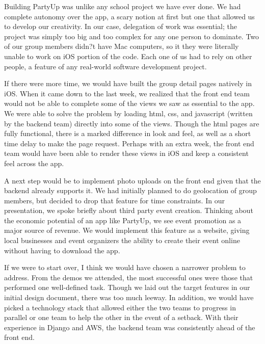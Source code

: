 \documentclass[12pt]{article}
\begin{document}
\bigskip

Building PartyUp was unlike any school project we have ever done. We had complete autonomy over the app, a scary notion at first but one that allowed us to develop our creativity. In our case, delegation of work was essential; the project was simply too big and too complex for any one person to dominate. Two of our group members didn?t have Mac computers, so it they were literally unable to work on iOS portion of the code. Each one of us had to rely on other people, a feature of any real-world software development project. 

\bigskip

If there were more time, we would have built the group detail pages natively in iOS. When it came down to the last week, we realized that the front end team would not be able to complete some of the views we saw as essential to the app. We were able to solve the problem by loading html, css, and javascript (written by the backend team) directly into some of the views. Though the html pages are fully functional, there is a marked difference in look and feel, as well as a short time delay to make the page request. Perhaps with an extra week, the front end team would have been able to render these views in iOS and keep a consistent feel across the app. 

\bigskip

A next step would be to implement photo uploads on the front end given that the backend already supports it. We had initially planned to do geolocation of group members, but decided to drop that feature for time constraints. In our presentation, we spoke briefly about third party event creation. Thinking about the economic potential of an app like PartyUp, we see event promotion as a major source of revenue. We would implement this feature as a website, giving local businesses and event organizers the ability to create their event online without having to download the app.

\bigskip

If we were to start over, I think we would have chosen a narrower problem to address. From the demos we attended, the most successful ones were those that performed one well-defined task. Though we laid out the target features in our initial design document, there was too much leeway. In addition, we would have picked a technology stack that allowed either the two teams to progress in parallel or one team to help the other in the event of a setback. With their experience in Django and AWS, the backend team was consistently ahead of the front end.
\end{document}
